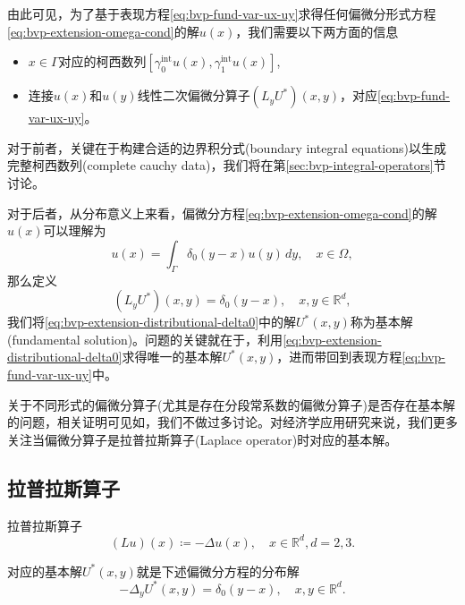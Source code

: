 由此可见，为了基于表现方程\eqref{eq:bvp-fund-var-ux-uy}求得任何偏微分形式方程\eqref{eq:bvp-extension-omega-cond}的解$u(x)$，我们需要以下两方面的信息
\begin{itemize}
  \item $x \in \Gamma$对应的柯西数列$\left[ \gamma_{0}^{\text{int}} u(x) , \gamma_{1}^{\text{int}} u(x) \right]$,
  \item 连接$u(x)$和$u(y)$线性二次偏微分算子$\left(L_y U^{*} \right) (x,y)$，对应\eqref{eq:bvp-fund-var-ux-uy}。
\end{itemize}

对于前者，关键在于构建合适的边界积分式(boundary integral equations)以生成完整柯西数列(complete cauchy data)，我们将在第\ref{sec:bvp-integral-operators}节讨论。

对于后者，从分布意义上来看，偏微分方程\eqref{eq:bvp-extension-omega-cond}的解$u(x)$可以理解为
\begin{equation*}
  u(x) = \int_{\Gamma} \delta_0 (y-x) u(y) \, dy, \quad x \in \Omega
,
\end{equation*}
那么定义
\begin{equation}
  \label{eq:bvp-extension-distributional-delta0}
  \left( L_y U^{*} \right) (x,y) = \delta_{0}(y-x), \quad x,y \in \mathbb{R}^{d},
\end{equation}
我们将\eqref{eq:bvp-extension-distributional-delta0}中的解$U^{*}(x,y)$称为基本解(fundamental solution)。问题的关键就在于，利用\eqref{eq:bvp-extension-distributional-delta0}求得唯一的基本解$U^{*}(x,y)$，进而带回到表现方程\eqref{eq:bvp-fund-var-ux-uy}中。

关于不同形式的偏微分算子(尤其是存在分段常系数的偏微分算子)是否存在基本解的问题，相关证明可见如\cite{Hormander:1983hm, Hormander:1983cb, Hormander:1994iv, Hormander:1994ee}，我们不做过多讨论。对经济学应用研究来说，我们更多关注当偏微分算子是拉普拉斯算子(Laplace operator)时对应的基本解。

\subsection{拉普拉斯算子}
拉普拉斯算子
\begin{equation*}
  (L u)(x) \coloneqq   - \Delta u(x), \quad x \in \mathbb{R}^d, d = 2,3.
\end{equation*}

对应的基本解$U^{*}(x,y)$就是下述偏微分方程的分布解
\begin{equation*}
  - \Delta_{y} U^{*} (x,y) = \delta_0(y-x), \quad x,y \in \mathbb{R}^d.
\end{equation*}

